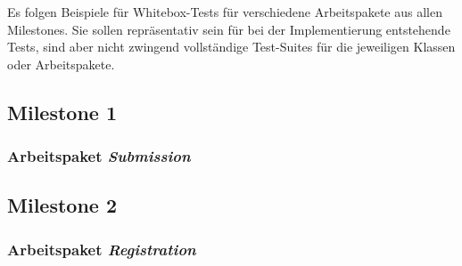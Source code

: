 \lstset{
    language=Java,
    basicstyle=\ttfamily\selectfont\scriptsize,
}

\newcommand{\testlisting}[1]{}

Es folgen Beispiele für Whitebox-Tests für verschiedene Arbeitspakete aus allen Milestones.
Sie sollen repräsentativ sein für bei der Implementierung entstehende Tests, sind aber nicht zwingend vollständige
Test-Suites für die jeweiligen Klassen oder Arbeitspakete.

\subsection{Milestone 1}\label{subsec:milestone1}

\subsubsection{Arbeitspaket \emph{Submission}}
\testlisting{SubmissionBackingTest}
\testlisting{SubmissionServiceTest}
\testlisting{SubmissionRepositoryTest}


\subsection{Milestone 2}\label{subsec:milestone2}

\subsubsection{Arbeitspaket \emph{Registration}}
\testlisting{PasswordValidatorTest}
\testlisting{RegistrationServiceTest}
\testlisting{UserRepositoryTest}